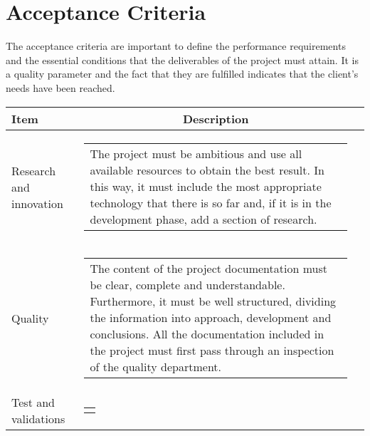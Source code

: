\section{Acceptance Criteria}

The acceptance criteria are important to define the performance requirements and the essential conditions that the deliverables of the project must attain. It is a quality parameter and the fact that they are fulfilled indicates that the client's needs have been reached.

\begin{longtable}[H]{l c c}
	\toprule[2pt]
	\textbf{Item} &  \textbf{Description}                                                                                                                                               \\ \midrule
	Research and innovation & \begin{tabular}[c]{@{}l@{}}\begin{minipage}[t]{\linewidth}
			The project must be ambitious and use all available resources to obtain the best result. In this way, it must include the most appropriate technology that there is so far and, if it is in the development phase, add a section of research. \vspace{0.3cm}
	\end{minipage} \end{tabular}                                                                                                                                            \\ \midrule
	Quality & \begin{tabular}[c]{@{}l@{}}\begin{minipage}[t]{\linewidth}
			The content of the project documentation must be clear, complete and understandable. Furthermore, it must be well structured, dividing the information into approach, development and conclusions.
			All the documentation included in the project must first pass through an inspection of the quality department. \vspace{0.3cm}
	\end{minipage} \end{tabular}                                                                                                                                            \\  \midrule
	Test and validations & \begin{tabular}[c]{@{}l@{}}\begin{minipage}[t]{\linewidth}

\end{minipage}
\end{tabular}
\end{longtable}
